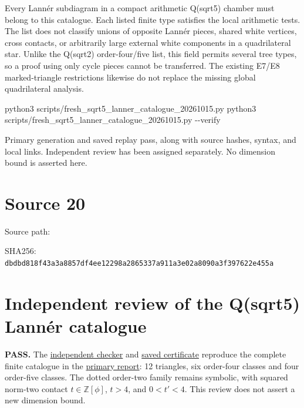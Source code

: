 \documentclass[
  10pt,
]{report}
\newenvironment{Shaded}{}{}
\newcommand{\AttributeTok}[1]{\textcolor[rgb]{0.49,0.56,0.16}{#1}}
\newcommand{\ExtensionTok}[1]{#1}
\newcommand{\NormalTok}[1]{#1}
\begin{document}
Every Lannér subdiagram in a compact arithmetic Q(sqrt5) chamber must
belong to this catalogue. Each listed finite type satisfies the local
arithmetic tests. The list does not classify unions of opposite Lannér
pieces, shared white vertices, cross contacts, or arbitrarily large
external white components in a quadrilateral star. Unlike the Q(sqrt2)
order-four/five list, this field permits several tree types, so a proof
using only cycle pieces cannot be transferred. The existing E7/E8
marked-triangle restrictions likewise do not replace the missing global
quadrilateral analysis.

\begin{Shaded}
\begin{Highlighting}[]
\ExtensionTok{python3}\NormalTok{ scripts/fresh\_sqrt5\_lanner\_catalogue\_20261015.py}
\ExtensionTok{python3}\NormalTok{ scripts/fresh\_sqrt5\_lanner\_catalogue\_20261015.py }\AttributeTok{{-}{-}verify}
\end{Highlighting}
\end{Shaded}

Primary generation and saved replay pass, along with source hashes,
syntax, and local links. Independent review has been assigned
separately. No dimension bound is asserted here.

\clearpage

\chapter{Source 20}\label{source-20}

Source path:

SHA256:
\nolinkurl{dbdbd818f43a3a8857df4ee12298a2865337a911a3e02a8090a3f397622e455a}

\chapter{Independent review of the Q(sqrt5) Lannér
catalogue}\label{independent-review-of-the-qsqrt5-lannuxe9r-catalogue}

\textbf{PASS.} The
\href{../scripts/fresh_sqrt5_lanner_catalogue_20261015_review.py}{independent
checker} and
\href{fresh_sqrt5_lanner_catalogue_20261015_review.json}{saved
certificate} reproduce the complete finite catalogue in the
\href{fresh_sqrt5_lanner_catalogue_20261015.md}{primary report}: 12
triangles, six order-four classes and four order-five classes. The
dotted order-two family remains symbolic, with squared norm-two contact
\(t\in\mathbb Z[\phi]\), \(t>4\), and \(0<t'<4\). This review does not
assert a new dimension bound.
\end{document}
